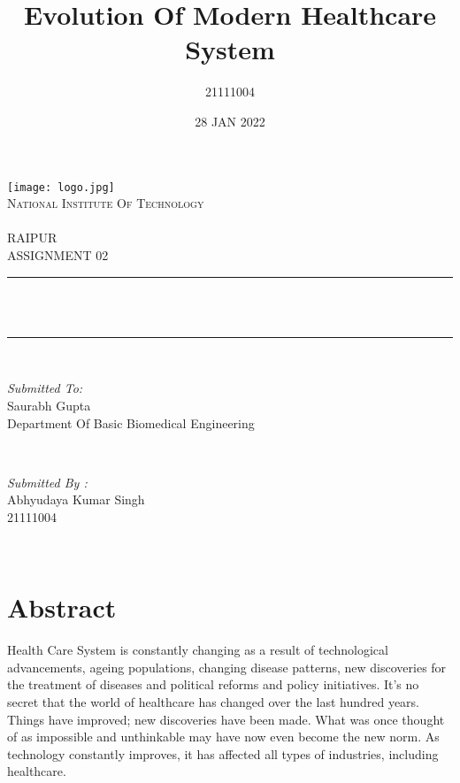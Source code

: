 \documentclass[12pt]{article}
\title{Evolution Of Modern Healthcare \newline  System}
\author{21111004}
\date{28 JAN 2022}
\makeatletter
\let\thetitle\@title
\makeatother
\begin{document}
\begin{titlepage}
	\centering
    \texttt{[image: logo.jpg]}\\[1.0 cm]	
    \textsc{\LARGE National Institute Of Technology \newline\\\\ RAIPUR}\\[2.0 CM]
    
	\textsc{\Large ASSIGNMENT 02}\\[0.5 cm]				%
	\rule{\linewidth}{0.4 mm} \\[0.4 cm]
	{ \huge \bfseries \thetitle}\\
	\rule{\linewidth}{0.4 mm} \\[1.5 cm]
	
	\begin{minipage}{0.6\textwidth}
		\begin{flushleft} \large
			\emph{Submitted To:}\\
			Saurabh Gupta\\
            Department Of Basic Biomedical Engineering\\
			\end{flushleft}
			\end{minipage}~
			\begin{minipage}{0.4\textwidth}
            
			\begin{flushright} \large
			\emph{Submitted By :}\\
			Abhyudaya Kumar Singh\\
            21111004\\
		\end{flushright}
        
	\end{minipage}\\[2 cm]
\end{titlepage}

\tableofcontents
\pagebreak

\section{Abstract}
Health Care System is constantly changing as a result of technological advancements, ageing populations, changing disease patterns, new discoveries for the treatment of diseases and political reforms and policy initiatives. \newline
It’s no secret that the world of healthcare has changed over the last hundred years. Things have improved; new discoveries have been made. What was once thought of as impossible and unthinkable may have now even become the new norm. As technology constantly improves, it has affected all types of industries, including healthcare.
\end{document}

